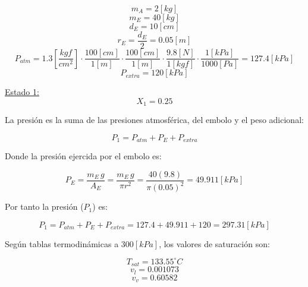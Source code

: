 \documentclass[letter,11pt]{article}
\begin{document}
\begin{enumerate}
\begin{equation*}
    m_A=2[kg]
\end{equation*}
\begin{equation*}
    m_E=40[kg]
\end{equation*}
\begin{equation*}
    d_E=10[cm]
\end{equation*}
\begin{equation*}
    r_E=\frac{d_E}{2}=0.05[m]
\end{equation*}
\begin{equation*}
    P_{atm}=1.3[\frac{kgf}{cm^2}]\cdot\frac{100[cm]}{1[m]}\cdot\frac{100[cm]}{1[m]}\cdot\frac{9.8[N]}{1[kgf]}\cdot\frac{1[kPa]}{1000[Pa]}=127.4[kPa]
\end{equation*}
\begin{equation*}
    P_{extra}=120[kPa]
\end{equation*}

\underline{Estado 1:} \\

\begin{equation*}
    X_1=0.25
\end{equation*}

La presión es la suma de las presiones atmosférica, del embolo y el peso adicional:

\begin{equation*}
    P_1=P_{atm}+P_E+P_{extra}
\end{equation*}

Donde la presión ejercida por el embolo es:

\begin{equation*}
    P_E=\frac{m_E\,g}{A_E}=\frac{m_E\,g}{\pi r^2}=\frac{40(9.8)}{\pi(0.05)^2}=49.911[kPa]
\end{equation*}

Por tanto la presión ($P_1$) es:

\begin{equation*}
    P_1=P_{atm}+P_E+P_{extra}=127.4+49.911+120=297.31[kPa]
\end{equation*}

Según tablas termodinámicas a $300[kPa]$, los valores de saturación son:

\begin{equation*}
    T_{sat}=133.55^\circ C
\end{equation*}
\begin{equation*}
    v_l=0.001073
\end{equation*}
\begin{equation*}
    v_v=0.60582
\end{equation*}


\end{enumerate}
\end{document}
